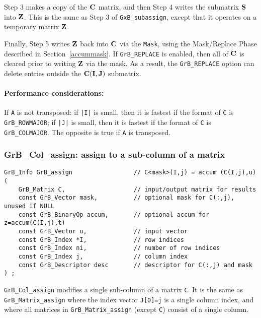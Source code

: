 \documentclass[12pt]{article}
\begin{document}
Step 3 makes a copy of the ${\bf C}$ matrix, and then Step 4 writes the
submatrix ${\bf S}$ into ${\bf Z}$.  This is the same as Step 3 of
\verb'GxB_subassign', except that it operates on a temporary matrix ${\bf Z}$.

Finally, Step 5 writes ${\bf Z}$ back into ${\bf C}$ via the \verb'Mask', using
the Mask/Replace Phase described in Section~\ref{accummask}.  If
\verb'GrB_REPLACE' is enabled, then all of ${\bf C}$ is cleared prior to
writing ${\bf Z}$ via the mask.  As a result, the \verb'GrB_REPLACE' option can
delete entries outside the ${\bf C(I,J)}$ submatrix.

\paragraph{\bf Performance considerations:} %
If \verb'A' is not transposed: if \verb'|I|' is small, then it is fastest if
the format of \verb'C' is \verb'GrB_ROWMAJOR'; if \verb'|J|' is small, then it is
fastest if the format of \verb'C' is \verb'GrB_COLMAJOR'.  The opposite is true
if \verb'A' is transposed.

\newpage
\subsubsection{{\sf GrB\_Col\_assign:} assign to a sub-column of a matrix}
\label{assign_column}

\begin{mdframed}[userdefinedwidth=6in]
{\footnotesize
\begin{verbatim}
GrB_Info GrB_assign                 // C<mask>(I,j) = accum (C(I,j),u)
(
    GrB_Matrix C,                   // input/output matrix for results
    const GrB_Vector mask,          // optional mask for C(:,j), unused if NULL
    const GrB_BinaryOp accum,       // optional accum for z=accum(C(I,j),t)
    const GrB_Vector u,             // input vector
    const GrB_Index *I,             // row indices
    const GrB_Index ni,             // number of row indices
    const GrB_Index j,              // column index
    const GrB_Descriptor desc       // descriptor for C(:,j) and mask
) ;
\end{verbatim} } \end{mdframed}

\verb'GrB_Col_assign' modifies a single sub-column of a matrix \verb'C'.  It is
the same as \verb'GrB_Matrix_assign' where the index vector \verb'J[0]=j' is a
single column index, and where all matrices in \verb'GrB_Matrix_assign' (except
\verb'C') consist of a single column.
\end{document}
